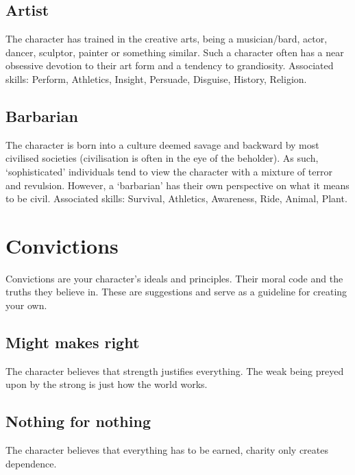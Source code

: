 \documentclass[a4paper,10pt,oneside]{book}
\begin{document}

\subsection{Artist}
The character has trained in the creative arts, being a musician/bard, actor, dancer, sculptor, painter or something similar. Such a character often has a near obsessive devotion to their art form and a tendency to grandiosity. Associated skills: Perform, Athletics, Insight, Persuade, Disguise, History, Religion.

\subsection{Barbarian}
The character is born into a culture deemed savage and backward by most civilised societies (civilisation is often in the eye of the beholder). As such, `sophisticated' individuals tend to view the character with a mixture of terror and revulsion. However, a `barbarian' has their own perspective on what it means to be civil. Associated skills: Survival, Athletics, Awareness, Ride, Animal, Plant.



\section{Convictions}
\label{sec:convictions}
Convictions are your character's ideals and principles. Their moral code and the truths they believe in. These are suggestions and serve as a guideline for creating your own.

\subsection{Might makes right}
The character believes that strength justifies everything. The weak being preyed upon by the strong is just how the world works. 

\subsection{Nothing for nothing}
The character believes that everything has to be earned, charity only creates dependence.
\end{document}
